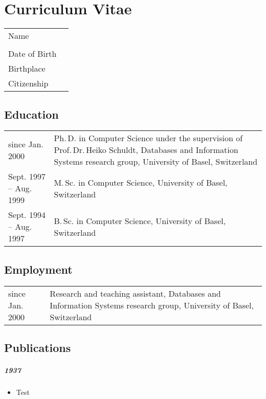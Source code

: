 
\chapter*{Curriculum Vitae}


\begin{tabularx}{\textwidth}{>{\raggedleft}p{}X}
	Name  & \thesisauthor \\
	& \thesisauthoraddress \\
	Date of Birth & \thesisauthordateofbirth \\
	Birthplace & \thesisauthorbirthplace \\
	Citizenship & \thesisauthornationalityCv \\
\end{tabularx}

\section*{Education}
\begin{tabularx}{\textwidth}{>{\raggedleft}p{}X}
	since Jan. 2000  & Ph.\,D. in Computer Science under the supervision of Prof.\,Dr.\,Heiko Schuldt, Databases and Information Systems research group, University of Basel, Switzerland \\
	\rule{0pt}{3ex}%
	Sept. 1997 -- Aug. 1999  & M.\,Sc. in Computer Science, University of Basel, Switzerland \\
	\rule{0pt}{3ex}%
	Sept. 1994 -- Aug. 1997  & B.\,Sc. in Computer Science, University of Basel, Switzerland
\end{tabularx}

\section*{Employment}
\begin{tabularx}{\textwidth}{>{\raggedleft}p{}X}
	since Jan. 2000  & Research and teaching assistant, Databases and Information Systems research group, University of Basel, Switzerland
\end{tabularx}

\section*{Publications}

\paragraph{1937}
\begin{itemize}
	\item Test %
\end{itemize}


\cleardoublepage
